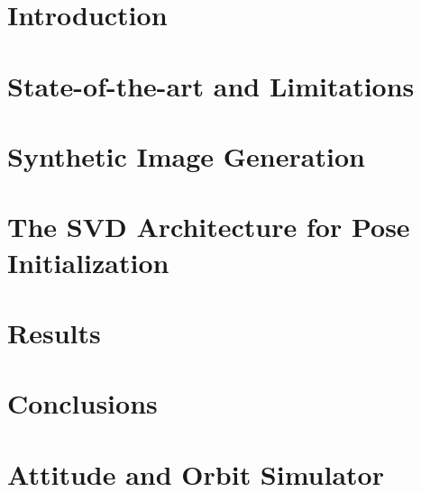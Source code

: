 \documentclass[a4paper,twoside,12pt]{book}
\begin{document}
{}
\listoftables
\cleardoublepage{}

\clearpage
\printnoidxglossary[title=List of Symbols]

\clearpage
\printnoidxglossary[type=\acronymtype,title=Abbreviated Terms]

\chapter{Introduction\label{chap:introduction}}

\cleardoublepage{}

\chapter{State-of-the-art and Limitations\label{chap:first-chapter}}

\cleardoublepage{}
\chapter{Synthetic Image Generation\label{chap:second-chapter}}

\cleardoublepage{}
\chapter{The SVD Architecture for Pose Initialization\label{chap:third-chapter}}

\cleardoublepage{}
\chapter{Results\label{chap:fourth-chapter}}

\cleardoublepage{}

\chapter{Conclusions}\label{chap:conclusions}

\cleardoublepage{}

\appendix
\chapter{Attitude and Orbit Simulator \label{app:first-appendix}}

\cleardoublepage{}
\end{document}
